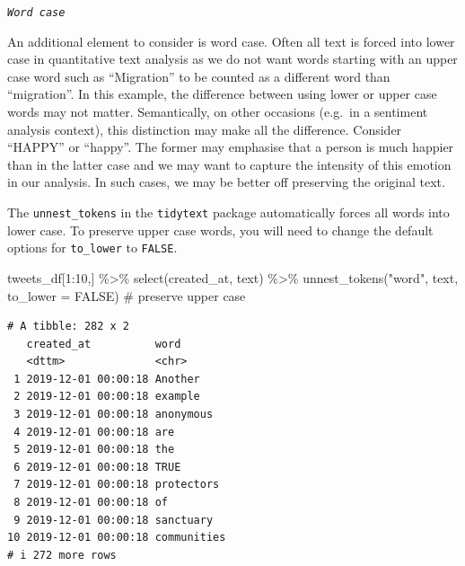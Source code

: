 \documentclass[
  letterpaper,
  DIV=11,
  numbers=noendperiod]{scrreprt}
\newenvironment{Shaded}{\begin{snugshade}}{\end{snugshade}}
\newcommand{\AttributeTok}[1]{\textcolor[rgb]{0.40,0.45,0.13}{#1}}
\newcommand{\CommentTok}[1]{\textcolor[rgb]{0.37,0.37,0.37}{#1}}
\newcommand{\ConstantTok}[1]{\textcolor[rgb]{0.56,0.35,0.01}{#1}}
\newcommand{\DecValTok}[1]{\textcolor[rgb]{0.68,0.00,0.00}{#1}}
\newcommand{\FunctionTok}[1]{\textcolor[rgb]{0.28,0.35,0.67}{#1}}
\newcommand{\NormalTok}[1]{\textcolor[rgb]{0.00,0.23,0.31}{#1}}
\newcommand{\OtherTok}[1]{\textcolor[rgb]{0.00,0.23,0.31}{#1}}
\newcommand{\SpecialCharTok}[1]{\textcolor[rgb]{0.37,0.37,0.37}{#1}}
\newcommand{\StringTok}[1]{\textcolor[rgb]{0.13,0.47,0.30}{#1}}
\begin{document}
\begin{Shaded}
\end{Shaded}

\emph{\texttt{Word\ case}}

An additional element to consider is word case. Often all text is forced
into lower case in quantitative text analysis as we do not want words
starting with an upper case word such as ``Migration'' to be counted as
a different word than ``migration''. In this example, the difference
between using lower or upper case words may not matter. Semantically, on
other occasions (e.g.~in a sentiment analysis context), this distinction
may make all the difference. Consider ``HAPPY'' or ``happy''. The former
may emphasise that a person is much happier than in the latter case and
we may want to capture the intensity of this emotion in our analysis. In
such cases, we may be better off preserving the original text.

The \texttt{unnest\_tokens} in the \texttt{tidytext} package
automatically forces all words into lower case. To preserve upper case
words, you will need to change the default options for
\texttt{to\_lower} to \texttt{FALSE}.

\begin{Shaded}
\begin{Highlighting}[]
\NormalTok{tweets\_df[}\DecValTok{1}\SpecialCharTok{:}\DecValTok{10}\NormalTok{,] }\SpecialCharTok{\%\textgreater{}\%}
    \FunctionTok{select}\NormalTok{(created\_at, text) }\SpecialCharTok{\%\textgreater{}\%}
    \FunctionTok{unnest\_tokens}\NormalTok{(}\StringTok{"word"}\NormalTok{, }
\NormalTok{                  text, }
                  \AttributeTok{to\_lower =} \ConstantTok{FALSE}\NormalTok{) }\CommentTok{\# preserve upper case}
\end{Highlighting}
\end{Shaded}

\begin{verbatim}
# A tibble: 282 x 2
   created_at          word       
   <dttm>              <chr>      
 1 2019-12-01 00:00:18 Another    
 2 2019-12-01 00:00:18 example    
 3 2019-12-01 00:00:18 anonymous  
 4 2019-12-01 00:00:18 are        
 5 2019-12-01 00:00:18 the        
 6 2019-12-01 00:00:18 TRUE       
 7 2019-12-01 00:00:18 protectors 
 8 2019-12-01 00:00:18 of         
 9 2019-12-01 00:00:18 sanctuary  
10 2019-12-01 00:00:18 communities
# i 272 more rows
\end{verbatim}
\end{document}
